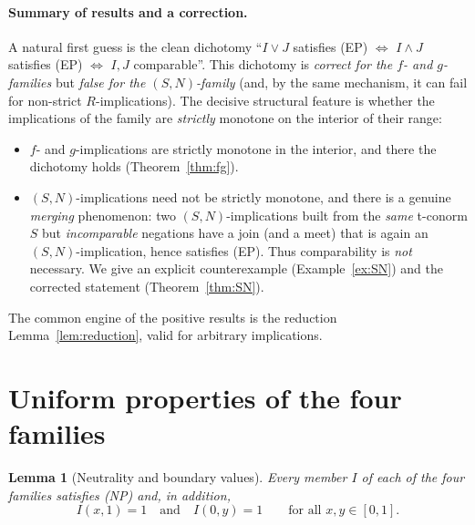 \documentclass{amsart}
\theoremstyle{plain}
\newtheorem{lemma}{Lemma}
\theoremstyle{definition}
\begin{document}
\paragraph{Summary of results and a correction.}
A natural first guess is the clean dichotomy ``$I\vee J$ satisfies (EP) $\iff$ $I\wedge J$
satisfies (EP) $\iff$ $I,J$ comparable''.  This dichotomy is \emph{correct for the
$f$- and $g$-families} but \emph{false for the $(S,N)$-family} (and, by the same
mechanism, it can fail for non-strict $R$-implications).  The decisive structural feature
is whether the implications of the family are \emph{strictly} monotone on the interior of
their range:
\begin{itemize}
\item $f$- and $g$-implications are strictly monotone in the interior, and there the
dichotomy holds (Theorem~\ref{thm:fg}).
\item $(S,N)$-implications need not be strictly monotone, and there is a genuine
\emph{merging} phenomenon: two $(S,N)$-implications built from the \emph{same} t-conorm
$S$ but \emph{incomparable} negations have a join (and a meet) that is again an
$(S,N)$-implication, hence satisfies (EP).  Thus comparability is \emph{not} necessary.
We give an explicit counterexample (Example~\ref{ex:SN}) and the corrected statement
(Theorem~\ref{thm:SN}).
\end{itemize}
The common engine of the positive results is the reduction
Lemma~\ref{lem:reduction}, valid for arbitrary implications.

\section{Uniform properties of the four families}

\begin{lemma}[Neutrality and boundary values]\label{lem:NP}
Every member $I$ of each of the four families satisfies \textup{(NP)} and, in addition,
\begin{equation}\label{eq:topright}
I(x,1)=1\quad\text{and}\quad I(0,y)=1\qquad\text{for all }x,y\in[0,1].
\end{equation}
\end{lemma}
\end{document}

